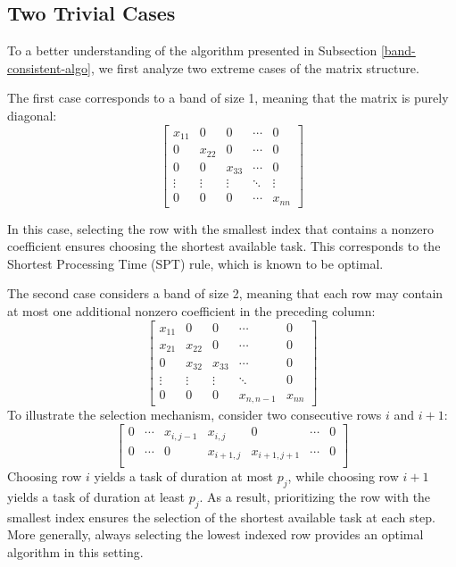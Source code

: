 \documentclass{article}
\begin{document}
\subsection{Two Trivial Cases}To a better understanding of  the algorithm presented in Subsection \ref{band-consistent-algo}, we first analyze two extreme cases of the matrix structure.

The first case corresponds to a band of size 1, meaning that the matrix is purely diagonal:  
\[
\begin{bmatrix}  
x_{11} & 0 & 0 & \cdots & 0 \\  
0 & x_{22} & 0 & \cdots & 0 \\  
0 & 0 & x_{33} & \cdots & 0 \\  
\vdots & \vdots & \vdots & \ddots & \vdots \\  
0 & 0 & 0 & \cdots & x_{nn}  
\end{bmatrix}  
\]

In this case, selecting the row with the smallest index that contains a nonzero coefficient ensures choosing the shortest available task. This corresponds to the Shortest Processing Time (SPT) rule, which is known to be optimal.

The second case considers a band of size 2, meaning that each row may contain at most one additional nonzero coefficient in the preceding column:  
\[
\begin{bmatrix}  
x_{11} & 0 & 0 & \cdots & 0 \\  
x_{21} & x_{22} & 0 & \cdots & 0 \\  
0 & x_{32} & x_{33} & \cdots & 0 \\  
\vdots & \vdots & \vdots & \ddots & 0 \\  
0 & 0 & 0 & x_{n,n-1} & x_{nn}  
\end{bmatrix}  
\]
To illustrate the selection mechanism, consider two consecutive rows $i$ and $i+1$:\[
\begin{bmatrix}  
0 & \cdots & x_{i, j-1} & x_{i,j} & 0 & \cdots & 0 \\  
0 & \cdots & 0 & x_{i+1, j} & x_{i+1, j+1} & \cdots & 0 \\  
\end{bmatrix}  
\]
Choosing row $i$ yields a task of duration at most $p_j$, while choosing row $i+1$ yields a task of duration at least $p_j$. As a result, prioritizing the row with the smallest index ensures the selection of the shortest available task at each step. More generally, always selecting the lowest indexed row provides an optimal algorithm in this setting.
\end{document}
